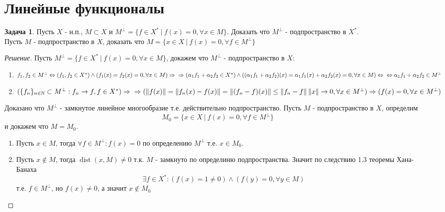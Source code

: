 \documentclass[12pt,a4paper]{article}
\theoremstyle{definition}
\newtheorem{exercise}{Задача}[section]
\newenvironment{solution}
{\renewcommand\qedsymbol{$\blacksquare$}\begin{proof}[Решение]}
{\end{proof}}
\newcommand{\Natural}{\mathbb{N}}
\newcommand{\norm}[1]{\left\lVert#1\right\rVert}
\newcommand{\setbuild}[2]{\{#1\:|\:#2\}}
\newcommand{\seq}[2]{\{#1\}_{#2}}
\DeclareMathOperator{\dist}{dist}
\begin{document}
\newpage

\section{Линейные функционалы}
	
\begin{exercise}
	Пусть $X$ - н.п., $M \subset X$ и $M^\perp = \setbuild{f \in X^*}{f(x) = 0, \forall x \in M}$. Доказать что $M^\perp$ - подпространство в $X^*$. \\ Пусть $M$ - подпространство в $X$, доказать что $M = \setbuild{x\in X}{f(x) = 0, \forall f \in M^\perp}$
\end{exercise}
\begin{solution}
	Пусть $M^\perp = \setbuild{f \in X^*}{f(x) = 0, \forall x \in M}$, докажем что $M^\perp$ - подпространство в $X$:
	\begin{enumerate}
		\item $f_1, f_2 \in M^\perp \Leftrightarrow (f_1, f_2 \in X^*) \wedge (f_1 (x) = f_2 (x) = 0, \forall x \in M) \Rightarrow \\
		\Rightarrow (\alpha_1 f_1 + \alpha_2 f_2 \in X^*) \wedge ((\alpha_1 f_1 + \alpha_2 f_2 )(x) = \alpha_1 f_1 (x) + \alpha_2 f_2 (x) = 0, \forall x \in M) \Leftrightarrow \\
		\Leftrightarrow \alpha_1 f_1 + \alpha_2 f_2 \in M^\perp$
			
		\item $(\seq{f_n}{n\in \Natural} \subset M^\perp: f_n \to f, f\in X^*) \Rightarrow \\
		\Rightarrow (\norm{f(x)} = \norm{f_n(x) - f(x)} = \norm{(f_n - f)(x)} \leq \norm{f_n - f}\norm{x} \to 0, \\ \forall x \in M^\perp) \Rightarrow (f(x) = 0, \forall x \in M^\perp)$
	\end{enumerate}
	Доказано что $M^\perp$ - замкнутое линейное многообразие т.е. действительно подпространство.
	\newline \newline
	Пусть $M$ - подпространство в $X$, определим $$M_0 = \setbuild{x\in X}{f(x) = 0, \forall f \in M^\perp}$$
	и докажем что $M = M_0$. 
	\begin{enumerate}
		\item Пусть $x \in M$, тогда $\forall f \in M^\perp: f(x) = 0$ по определению $M^\perp$ т.е. $x \in M_0$. 
		\item Пусть $x \notin M$, тогда $\dist(x, M) \neq 0$ т.к. $M$ - замкнуто по определиню подпространства. Значит по следствию 1.3 теоремы Хана-Банаха 
		$$\exists f \in X^*: (f(x) = 1 \neq 0) \wedge (f(y) = 0, \forall y \in M)$$
		т.е. $f \in M^\perp$, но $f(x) \neq 0$, а значит $x \notin M_0$
	\end{enumerate}
\end{solution}
\end{document}
